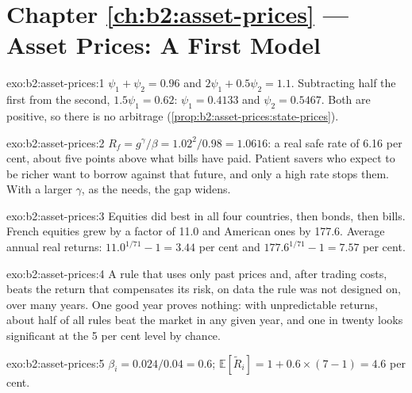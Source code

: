 \section*{Chapter \ref{ch:b2:asset-prices} --- Asset Prices: A First Model}

\begin{solution}{exo:b2:asset-prices:1}
$\psi_1 + \psi_2 = 0.96$ and $2\psi_1 + 0.5\psi_2 = 1.1$. Subtracting half the first from the second,
$1.5\psi_1 = 0.62$: $\psi_1 = 0.4133$ and $\psi_2 = 0.5467$. Both are positive, so there is no
arbitrage (\cref{prop:b2:asset-prices:state-prices}).
\end{solution}

\begin{solution}{exo:b2:asset-prices:2}
$R_f = g^{\gamma}/\beta = 1.02^2/0.98 = 1.0616$: a real safe rate of 6.16 per cent, about five points
above what bills have paid. Patient savers who expect to be richer want to borrow against that future,
and only a high rate stops them. With a larger $\gamma$, as the  needs, the gap widens.
\end{solution}

\begin{solution}{exo:b2:asset-prices:3}
Equities did best in all four countries, then bonds, then bills. French equities grew by a factor of
11.0 and American ones by 177.6. Average annual real returns: $11.0^{1/71} - 1 = 3.44$ per cent and
$177.6^{1/71} - 1 = 7.57$ per cent.
\end{solution}

\begin{solution}{exo:b2:asset-prices:4}
A rule that uses only past prices and, after trading costs, beats the return that compensates its risk,
on data the rule was not designed on, over many years. One good year proves nothing: with
unpredictable returns, about half of all rules beat the market in any given year, and one in twenty
looks significant at the 5 per cent level by chance.
\end{solution}

\begin{solution}{exo:b2:asset-prices:5}
$\beta_i = 0.024/0.04 = 0.6$; $\mathbb{E}[\tilde R_i] = 1 + 0.6 \times (7 - 1) = 4.6$ per cent.
\end{solution}

